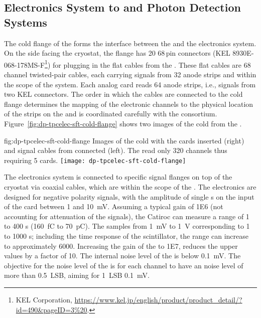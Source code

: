 \subsection{Electronics System to  and Photon Detection Systems}
\label{ssec:dp-tpcelec-intfc-crppmt}

The cold \fdth flange of the  forms the interface between the  and the  electronics system. On the side facing the cryostat, the flange  has \num{20} \num{68}\,pin connectors (KEL 8930E-068-178MS-F\footnote{KEL Corporation\texttrademark{}, \url{https://www.kel.jp/english/product/product_detail/?id=490\&pageID=3\%20}.}) for plugging in the flat cables from the . These flat cables are \num{68}\,channel twisted-pair cables, each carrying signals from \num{32} anode strips and within the scope of the  system. Each analog  card reads \num{64} anode strips, i.e., signals from two KEL connectors. The order in which the cables are connected to the cold flange determines the mapping of the electronic channels to the physical location of the strips on the  and is coordinated carefully with the  consortium. Figure~\ref{fig:dp-tpcelec-sft-cold-flange} shows two images of the cold \fdth from the .

\begin{dunefigure}{fig:dp-tpcelec-sft-cold-flange}
{Images of the   cold \fdth with the  cards inserted (right) and signal cables from  connected (left). The   read only \num{320} channels thus requiring \num{5}  cards. }
\texttt{[image: dp-tpcelec-sft-cold-flange]}
\end{dunefigure}

The  electronics system is connected to specific  signal \fdth flanges on top of the cryostat via coaxial cables, which are within the scope of the .
The  electronics are designed for negative polarity  signals, with the amplitude of single \phel{}s on the input of the card between \num{1} and \SI{10}{\milli\volt}. Assuming a typical  gain of \num{1E6} (not accounting for attenuation of the signals), the Catiroc  can measure a range of \num{1} to \num{400} \phel{}s (\SI{160}{\femto\coulomb} to \SI{70}{\pico\coulomb}). The  samples from \SI{1}{\milli\volt} to \SI{1}{\volt} corresponding to \num{1} to \num{1000} \phel{}s; including the time response of the scintillator, the range can increase to approximately \num{6000}. Increasing the gain of the  to \num{1E7}, reduces the upper values by a factor of 10. The internal noise level of the  is below \SI{0.1}{\milli\volt}. The objective for the noise level of the  is for each channel to have an \rms noise level of more than \SI{0.5}{LSB}, aiming for \SI{1}{LSB} \SI{0.1}{\milli\volt}.



